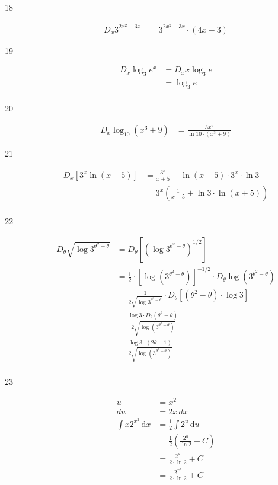\documentclass{exam}
\begin{document}
\begin{description}
\item[18]
\begin{align*}
  D_x 3^{2x^2 - 3x} &= 3^{2x^2 - 3x} \cdot (4x - 3)
\end{align*}

\item[19]
\begin{align*}
  D_x \log_3 e^x &= D_x x \log_3 e \\
  &= \log_3 e \\
\end{align*}

\item[20]
\begin{align*}
  D_x \log_{10} (x^3 + 9) &= \frac{3x^2}{\ln 10 \cdot (x^3 + 9)}
\end{align*}

\item[21]
\begin{align*}
  D_x \left[ 3^x \ln(x + 5) \right] &= \frac{3^x}{x + 5} + \ln(x + 5) \cdot 3^x \cdot \ln 3 \\
  &= 3^x \left( \frac{1}{x + 5} + \ln 3 \cdot \ln(x + 5) \right) \\
\end{align*}

\item[22]
\begin{align*}
  D_{\theta} \sqrt{ \log 3^{\theta^2 - \theta}} &=  D_{\theta} [ (\log 3^{\theta^2 - \theta})^{1/2} ] \\
    &= \frac{1}{2} \cdot [ \log (3^{\theta^2 - \theta}) ]^{-1/2} \cdot D_{\theta} \log \left(3^{\theta^2 - \theta}\right) \\
    &= \frac{1}{2 \sqrt{ \log 3^{\theta^2 - \theta}}} \cdot  D_{\theta} [  (\theta^2 - \theta) \cdot \log 3 ] \\
    &= \frac{\log 3 \cdot D_{\theta} (\theta^2 - \theta)}{2 \sqrt{\log \left(3^{\theta^2 - \theta}\right)}}  \\
    &= \frac{\log 3 \cdot (2\theta - 1)}{2 \sqrt{\log \left(3^{\theta^2 - \theta}\right)}}  \\
\end{align*}

\item[23]
\begin{align*}
  u &= x^2 \\
  du &= 2 x \, dx
\\
  \int x 2^{x^2} \, \mathrm{d}x &= \frac{1}{2} \int 2^u \, \mathrm{d}u \\
  &= \frac{1}{2} \left( \frac{2^u}{\ln 2} + C \right) \\
  &= \frac{2^u}{2 \cdot \ln 2} + C \\
  &= \frac{2^{x^2}}{2 \cdot \ln 2} + C \\
\end{align*}


\end{description}
\end{document}
